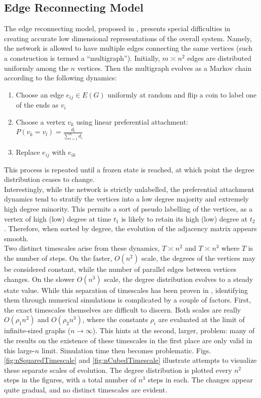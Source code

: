 \documentclass[11pt]{article}
\begin{document}
\subsection{Edge Reconnecting Model}
The edge reconnecting model, proposed in \cite{balazs'paper}, presents special difficulties in creating accurate low dimensional representations of the overall system. Namely, the network is allowed to have multiple edges connecting the same vertices (such a construction is termed a ``multigraph''). Initially, $m\asymp n^{2}$ edges are distributed uniformly among the $n$ vertices. Then the multigraph evolves as a Markov chain according to the following dynamics:
\begin{enumerate}
\item Choose an edge $e_{ij} \in E(G)$ uniformly at random and flip a coin to label one of the ends as $v_{i}$
\item Choose a vertex $v_{k}$ using linear preferential attachment: $P(v_{k} = v_{l}) = \frac{d_{l}}{\sum\limits_{i=1}^{n} d_{i}}$
\item Replace $e_{ij}$ with $e_{ik}$
\end{enumerate}
This process is repeated until a frozen state is reached, at which point the degree distribution ceases to change.\vspace{1mm}\\
Interestingly, while the network is strictly unlabelled, the preferential attachment dynamics tend to stratify the vertices into a low degree majority and extremely high degree minority. This permits a sort of pseudo labelling of the vertices, as a vertex of high (low) degree at time $t_{1}$ is likely to retain its high (low) degree at $t_{2}$. Therefore, when sorted by degree, the evolution of the adjacency matrix appears smooth. \vspace{1mm}\\
Two distinct timescales arise from these dynamics, $T\asymp n^{2}$ and $T\asymp n^{3}$ where $T$ is the number of steps. On the faster, $O(n^{2})$ scale, the degrees of the vertices may be considered constant, while the number of parallel edges between vertices changes. On the slower $O(n^{3})$ scale, the degree distribution evolves to a steady state value. While this separation of timescales has been proven in \cite{balazs:rsa12}, identifying them through numerical simulations is complicated by a couple of factors. First, the exact timescales themselves are difficult to discern. Both scales are really $O(\rho_{1} n^{2})$ and $O(\rho_{2} n^{3})$, where the constants $\rho_{i}$ are evaluated at the limit of infinite-sized graphs ($n\rightarrow \infty$). This hints at the second, larger, problem: many of the results on the existence of these timescales in the first place are only valid in this large-$n$ limit. Simulation time then becomes problematic. Figs. \ref{fig:nSquaredTimescale} and \ref{fig:nCubedTimescale} illustrate attempts to visualize these separate scales of evolution. The degree distribution is plotted every $n^{2}$ steps in the figures, with a total number of $n^{3}$ steps in each. The changes appear quite gradual, and no distinct timescales are evident.\\
\end{document}
